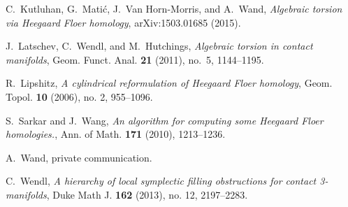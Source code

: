 \documentclass[11pt,oneside,english]{amsart}
\numberwithin{equation}{section}
\numberwithin{figure}{section}
\theoremstyle{definition}
\theoremstyle{plain}
\theoremstyle{plain}
\theoremstyle{remark}
\theoremstyle{plain}
\begin{document}
\begin{thebibliography}{Juhï¿½sz}
 C.~Kutluhan, G.~Mati\'c, J.~Van Horn-Morris, and A.~Wand,
\emph{Algebraic torsion via Heegaard Floer homology}, arXiv:1503.01685 (2015).

 J.~Latschev, C.~Wendl, and M.~Hutchings,
\emph{Algebraic torsion in contact manifolds},
Geom. Funct. Anal. \textbf{21} (2011), no.~5, 1144--1195.

 R.~Lipshitz, \emph{A cylindrical
reformulation of Heegaard Floer homology}, Geom. Topol. \textbf{10} (2006),
no. 2, 955--1096.

 S.~Sarkar and J.~Wang, \emph{An
algorithm for computing some Heegaard Floer homologies.},
Ann. of Math. \textbf{171} (2010), 1213--1236.

 A.~Wand, private communication.

 C.~Wendl, \emph{A hierarchy of local symplectic filling obstructions for contact 3-manifolds},
Duke Math J. \textbf{162} (2013), no. 12, 2197--2283.
\end{thebibliography}
\end{document}
